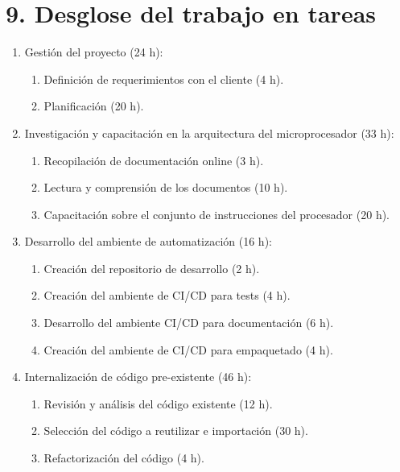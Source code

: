 \section{9. Desglose del trabajo en tareas}
\label{sec:9-desglose-del-trabajo-en-tareas}


\begin{enumerate}
\item Gestión del proyecto (24 h):
  \begin{enumerate}
  \item Definición de requerimientos con el cliente (4 h).
  \item Planificación (20 h).
  \end{enumerate}

\item Investigación y capacitación en la arquitectura del microprocesador (33 h):

  \begin{enumerate}
  \item Recopilación de documentación online (3 h).
  \item Lectura y comprensión de los documentos (10 h).
  \item Capacitación sobre el conjunto de instrucciones del procesador (20 h).
  \end{enumerate}

\item Desarrollo del ambiente de automatización (16 h):

  \begin{enumerate}
  \item Creación del repositorio de desarrollo (2 h).
  \item Creación del ambiente de CI/CD para tests (4 h).
  \item Desarrollo  del ambiente CI/CD para documentación (6 h).
  \item Creación del ambiente de CI/CD para empaquetado (4 h).
  \end{enumerate}

\item Internalización de código pre-existente (46 h):

  \begin{enumerate}
  \item Revisión y análisis del código existente (12 h).
  \item Selección del código a reutilizar e importación (30 h).
  \item Refactorización del código (4 h).
  \end{enumerate}


\end{enumerate}
